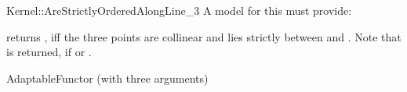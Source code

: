 \begin{ccRefFunctionObjectConcept}{Kernel::AreStrictlyOrderedAlongLine_3}
A model for this must provide:


          {returns , iff the three points are collinear and 
           lies strictly between  and .
          Note that  is returned, if  or
          .}

\ccRefines
AdaptableFunctor (with three arguments)

\ccSeeAlso
{}  \\


\end{ccRefFunctionObjectConcept}         

